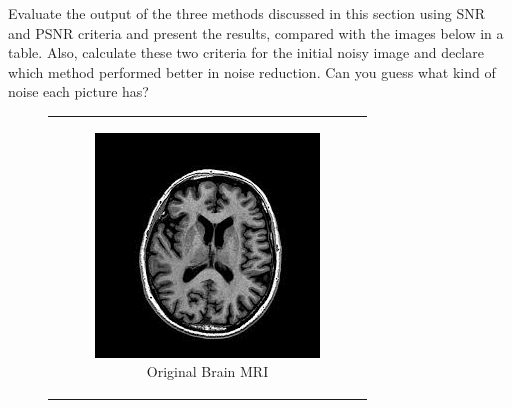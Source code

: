 \documentclass[hidelinks,12pt]{article}
\begin{document}
	Evaluate the output of the three methods discussed in this section using SNR and PSNR criteria and present the results, compared with the images below in a table. Also, calculate these two criteria for the initial noisy image and declare which method performed better in noise reduction. Can you guess what kind of noise each picture has?
	
		\begin{figure}[!h]
		\centering
			\begin{tabular}{c}
				\begin{subfigure}[h]{0.3\textwidth}
					\centering
					\includegraphics[width=\textwidth]{figures/brain_mri/original.jpg}
					\caption{Original Brain MRI}
				\end{subfigure}
				\hfill
				\begin{subfigure}[h]{0.3\textwidth}
					\centering

\end{subfigure}
\end{tabular}
\end{figure}
\end{document}
